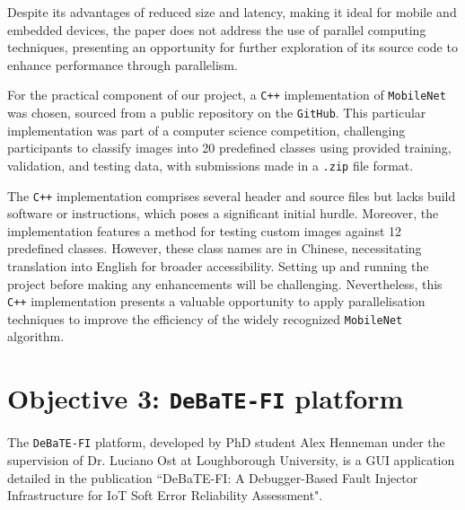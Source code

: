 Despite its advantages of reduced size and latency, making it ideal for mobile and embedded devices, the paper\cite{mobilenet_paper} does not address the use of parallel computing techniques, presenting an opportunity for further exploration of its source code to enhance performance through parallelism.

For the practical component of our project, a \texttt{C++} implementation of \texttt{MobileNet} was chosen, sourced from a public repository on the \texttt{GitHub}\cite{mobilenet_repo}. This particular implementation was part of a computer science competition\cite{mobilenet_competition}, challenging participants to classify images into 20 predefined classes using provided training, validation, and testing data, with submissions made in a \texttt{.zip} file format.

The \texttt{C++} implementation comprises several header and source files but lacks build software or instructions, which poses a significant initial hurdle. Moreover, the implementation features a method for testing custom images against 12 predefined classes. However, these class names are in Chinese, necessitating translation into English for broader accessibility. Setting up and running the project before making any enhancements will be challenging. Nevertheless, this \texttt{C++} implementation presents a valuable opportunity to apply parallelisation techniques to improve the efficiency of the widely recognized \texttt{MobileNet} algorithm.

\section{Objective 3: \texttt{DeBaTE-FI} platform}

The \texttt{DeBaTE-FI} platform, developed by PhD student Alex Henneman under the supervision of Dr. Luciano Ost at Loughborough University, is a GUI application detailed in the publication ``DeBaTE-FI: A Debugger-Based Fault Injector Infrastructure for IoT Soft Error Reliability Assessment"\cite{debate_fi_publication}.

